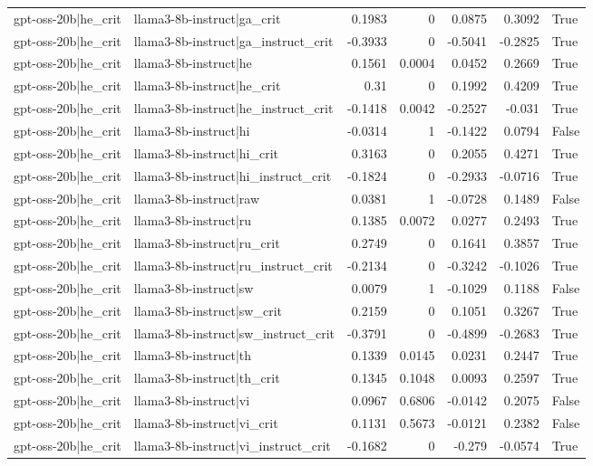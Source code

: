 \begin{table}
\begin{tabular}{l l r r r r l}
gpt-oss-20b|he_crit & llama3-8b-instruct|ga_crit & 0.1983 & 0 & 0.0875 & 0.3092 & True \\
gpt-oss-20b|he_crit & llama3-8b-instruct|ga_instruct_crit & -0.3933 & 0 & -0.5041 & -0.2825 & True \\
gpt-oss-20b|he_crit & llama3-8b-instruct|he & 0.1561 & 0.0004 & 0.0452 & 0.2669 & True \\
gpt-oss-20b|he_crit & llama3-8b-instruct|he_crit & 0.31 & 0 & 0.1992 & 0.4209 & True \\
gpt-oss-20b|he_crit & llama3-8b-instruct|he_instruct_crit & -0.1418 & 0.0042 & -0.2527 & -0.031 & True \\
gpt-oss-20b|he_crit & llama3-8b-instruct|hi & -0.0314 & 1 & -0.1422 & 0.0794 & False \\
gpt-oss-20b|he_crit & llama3-8b-instruct|hi_crit & 0.3163 & 0 & 0.2055 & 0.4271 & True \\
gpt-oss-20b|he_crit & llama3-8b-instruct|hi_instruct_crit & -0.1824 & 0 & -0.2933 & -0.0716 & True \\
gpt-oss-20b|he_crit & llama3-8b-instruct|raw & 0.0381 & 1 & -0.0728 & 0.1489 & False \\
gpt-oss-20b|he_crit & llama3-8b-instruct|ru & 0.1385 & 0.0072 & 0.0277 & 0.2493 & True \\
gpt-oss-20b|he_crit & llama3-8b-instruct|ru_crit & 0.2749 & 0 & 0.1641 & 0.3857 & True \\
gpt-oss-20b|he_crit & llama3-8b-instruct|ru_instruct_crit & -0.2134 & 0 & -0.3242 & -0.1026 & True \\
gpt-oss-20b|he_crit & llama3-8b-instruct|sw & 0.0079 & 1 & -0.1029 & 0.1188 & False \\
gpt-oss-20b|he_crit & llama3-8b-instruct|sw_crit & 0.2159 & 0 & 0.1051 & 0.3267 & True \\
gpt-oss-20b|he_crit & llama3-8b-instruct|sw_instruct_crit & -0.3791 & 0 & -0.4899 & -0.2683 & True \\
gpt-oss-20b|he_crit & llama3-8b-instruct|th & 0.1339 & 0.0145 & 0.0231 & 0.2447 & True \\
gpt-oss-20b|he_crit & llama3-8b-instruct|th_crit & 0.1345 & 0.1048 & 0.0093 & 0.2597 & True \\
gpt-oss-20b|he_crit & llama3-8b-instruct|vi & 0.0967 & 0.6806 & -0.0142 & 0.2075 & False \\
gpt-oss-20b|he_crit & llama3-8b-instruct|vi_crit & 0.1131 & 0.5673 & -0.0121 & 0.2382 & False \\
gpt-oss-20b|he_crit & llama3-8b-instruct|vi_instruct_crit & -0.1682 & 0 & -0.279 & -0.0574 & True \\

\end{tabular}
\end{table}

